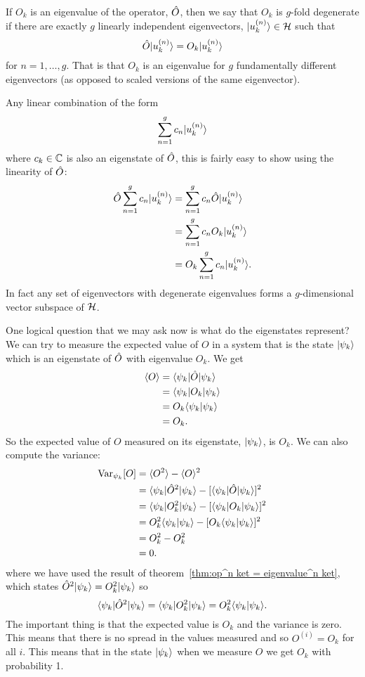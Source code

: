     If \(O_k\) is an eigenvalue of the operator, \(\hat{O}\), then we say that \(O_k\) is \(g\)-fold degenerate if there are exactly \(g\) linearly independent eigenvectors, \(\vert {u_k^{(n)}} \rangle\in\mathcal{H}\) such that
    \[\hat{O}\vert {u_k^{(n)}} \rangle = O_k\vert {u_k^{(n)}} \rangle\]
    for \(n = 1, \dotsc, g\).
    That is that \(O_k\) is an eigenvalue for \(g\) fundamentally different eigenvectors (as opposed to scaled versions of the same eigenvector).
    
    Any linear combination of the form
    \[\sum_{n=1}^{g}c_n\vert {u_k^{(n)}} \rangle\]
    where \(c_k\in\mathbb{C}\) is also an eigenstate of \(\hat{O}\), this is fairly easy to show using the linearity of \(\hat{O}\):
    \begin{align*}
        \hat{O}\sum_{n=1}^{g}c_n\vert {u_k^{(n)}} \rangle &= \sum_{n=1}^{g}c_n\hat{O}\vert {u_k^{(n)}} \rangle\\
        &= \sum_{n=1}^{g}c_nO_k\vert {u_k^{(n)}} \rangle\\
        &= O_k\sum_{n=1}^{g}c_n\vert {u_k^{(n)}} \rangle.
    \end{align*}
    In fact any set of eigenvectors with degenerate eigenvalues forms a \(g\)-dimensional vector subspace of \(\mathcal{H}\).
    
    One logical question that we may ask now is what do the eigenstates represent?
    We can try to measure the expected value of \(O\) in a system that is the state \(\vert {\psi_k} \rangle\) which is an eigenstate of \(\hat{O}\) with eigenvalue \(O_k\).
    We get
    \begin{align*}
        \langle{O}\rangle &= \langle {\psi_k} \vert\hat{O}\vert {\psi_k} \rangle\\
        &= \langle {\psi_k} \vert O_k\vert {\psi_k} \rangle\\
        &= O_k\langle {\psi_k} \vert {\psi_k} \rangle\\
        &= O_k.
    \end{align*}
    So the expected value of \(O\) measured on its eigenstate, \(\vert {\psi_k} \rangle\), is \(O_k\).
    We can also compute the variance:
    \begin{align*}
        \operatorname{Var}_{\psi_k}[O] &= \langle{O^2}\rangle - \langle{O}\rangle^2\\
        &= \langle {\psi_k} \vert\hat{O}^2\vert {\psi_k} \rangle - [\langle {\psi_k} \vert\hat{O}\vert {\psi_k} \rangle]^2\\
        &= \langle {\psi_k} \vert O_k^2\vert {\psi_k} \rangle - [\langle {\psi_k} \vert O_k\vert {\psi_k} \rangle]^2\\
        &= O_k^2\langle {\psi_k} \vert {\psi_k} \rangle - [O_k\langle {\psi_k} \vert {\psi_k} \rangle]^2\\
        &= O_k^2 - O_k^2\\
        &= 0.
    \end{align*}
    where we have used the result of theorem~\ref{thm:op^n ket = eigenvalue^n ket}, which states \(\hat{O}^2\vert {\psi_k} \rangle = O_k^2\vert {\psi_k} \rangle\) so
    \[\langle {\psi_k} \vert\hat{O}^2\vert {\psi_k} \rangle = \langle {\psi_k} \vert O_k^2\vert {\psi_k} \rangle = O_k^2\langle {\psi_k} \vert {\psi_k} \rangle.\]
    The important thing is that the expected value is \(O_k\) and the variance is zero.
    This means that there is no spread in the values measured and so \(O^{(i)} = O_k\) for all \(i\).
    This means that in the state \(\vert {\psi_k} \rangle\) when we measure \(O\) we get \(O_k\) with probability 1.
    

